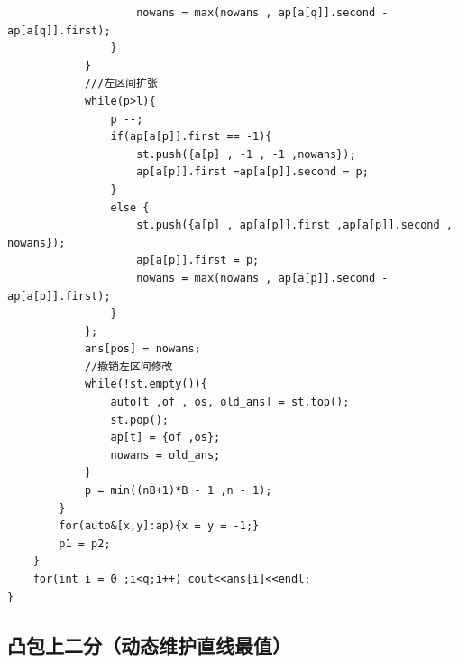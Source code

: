 \begin{lstlisting}
                    nowans = max(nowans , ap[a[q]].second - ap[a[q]].first);
                }
            }
            ///左区间扩张
            while(p>l){
                p --;
                if(ap[a[p]].first == -1){
                    st.push({a[p] , -1 , -1 ,nowans});
                    ap[a[p]].first =ap[a[p]].second = p;
                }
                else {
                    st.push({a[p] , ap[a[p]].first ,ap[a[p]].second , nowans});
                    ap[a[p]].first = p;
                    nowans = max(nowans , ap[a[p]].second - ap[a[p]].first);
                }
            };
            ans[pos] = nowans;
            //撤销左区间修改
            while(!st.empty()){
                auto[t ,of , os, old_ans] = st.top();
                st.pop();
                ap[t] = {of ,os};
                nowans = old_ans;
            }
            p = min((nB+1)*B - 1 ,n - 1);
        }
        for(auto&[x,y]:ap){x = y = -1;}
        p1 = p2;
    }
    for(int i = 0 ;i<q;i++) cout<<ans[i]<<endl;
}
\end{lstlisting}

\subsection{凸包上二分（动态维护直线最值）}

